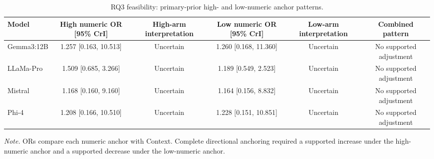 \begin{table}[tbp]
\caption{RQ3 feasibility: primary-prior high- and low-numeric anchor patterns.}
\label{tab:rq3_feasibility_numeric_patterns_appendix}
\begin{tabular}{lccccc}
\toprule
Model & High numeric OR [95\% CrI] & High-arm interpretation & Low numeric OR [95\% CrI] & Low-arm interpretation & Combined pattern \\
\midrule
Gemma3:12B & 1.257 [0.163, 10.513] & Uncertain & 1.260 [0.168, 11.360] & Uncertain & No supported adjustment \\
LLaMa-Pro & 1.509 [0.685, 3.266] & Uncertain & 1.189 [0.549, 2.523] & Uncertain & No supported adjustment \\
Mistral & 1.168 [0.160, 9.160] & Uncertain & 1.164 [0.156, 8.832] & Uncertain & No supported adjustment \\
Phi-4 & 1.208 [0.166, 10.510] & Uncertain & 1.228 [0.151, 10.851] & Uncertain & No supported adjustment \\
\bottomrule
\end{tabular}
\vspace{2pt}
\begin{minipage}{\linewidth}
\footnotesize\textit{Note.} ORs compare each numeric anchor with Context. Complete directional anchoring required a supported increase under the high-numeric anchor and a supported decrease under the low-numeric anchor.
\end{minipage}
\end{table}
